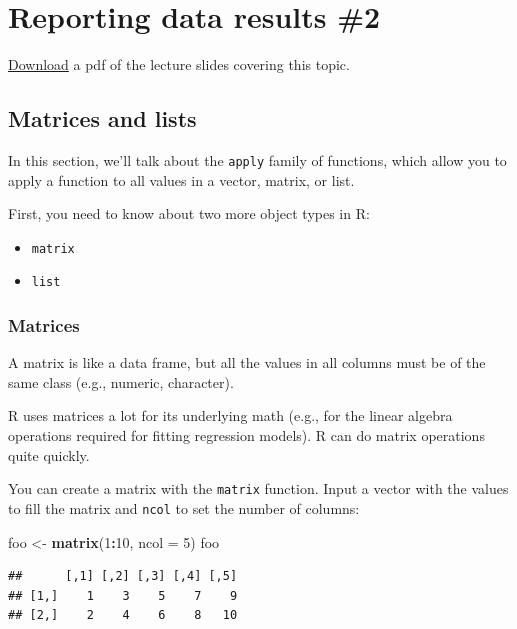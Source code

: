 \documentclass[]{book}
\makeatletter
\newenvironment{Shaded}{\begin{snugshade}}{\end{snugshade}}
\newcommand{\KeywordTok}[1]{\textcolor[rgb]{0.13,0.29,0.53}{\textbf{#1}}}
\newcommand{\DataTypeTok}[1]{\textcolor[rgb]{0.13,0.29,0.53}{#1}}
\newcommand{\DecValTok}[1]{\textcolor[rgb]{0.00,0.00,0.81}{#1}}
\newcommand{\StringTok}[1]{\textcolor[rgb]{0.31,0.60,0.02}{#1}}
\newcommand{\OperatorTok}[1]{\textcolor[rgb]{0.81,0.36,0.00}{\textbf{#1}}}
\newcommand{\NormalTok}[1]{#1}
\providecommand{\tightlist}{%
  \setlength{\itemsep}{0pt}\setlength{\parskip}{0pt}}
\newenvironment{kframe}{%
\medskip{}
\setlength{\fboxsep}{.8em}
 \def\at@end@of@kframe{}%
 \ifinner\ifhmode%
  \def\at@end@of@kframe{\end{minipage}}%
  \begin{minipage}{\columnwidth}%
 \fi\fi%
 \def\FrameCommand##1{\hskip\@totalleftmargin \hskip-\fboxsep
 \colorbox{shadecolor}{##1}\hskip-\fboxsep
     \hskip-\linewidth \hskip-\@totalleftmargin \hskip\columnwidth}%
 \MakeFramed {\advance\hsize-\width
   \@totalleftmargin\z@ \linewidth\hsize
   \@setminipage}}%
 {\par\unskip\endMakeFramed%
 \at@end@of@kframe}
\renewenvironment{Shaded}{\begin{kframe}}{\end{kframe}}
\theoremstyle{definition}
\theoremstyle{definition}
\theoremstyle{definition}
\theoremstyle{remark}
\makeatother
\begin{document}
\chapter{Reporting data results \#2}\label{reporting-data-results-2}

\href{https://github.com/geanders/RProgrammingForResearch/raw/master/slides/CourseNotes_Week8.pdf}{Download}
a pdf of the lecture slides covering this topic.

\section{Matrices and lists}\label{matrices-and-lists}

In this section, we'll talk about the \texttt{apply} family of
functions, which allow you to apply a function to all values in a
vector, matrix, or list. \bigskip

First, you need to know about two more object types in R:

\begin{itemize}
\tightlist
\item
  \texttt{matrix}
\item
  \texttt{list}
\end{itemize}

\subsection{Matrices}\label{matrices}

A matrix is like a data frame, but all the values in all columns must be
of the same class (e.g., numeric, character).

R uses matrices a lot for its underlying math (e.g., for the linear
algebra operations required for fitting regression models). R can do
matrix operations quite quickly.

You can create a matrix with the \texttt{matrix} function. Input a
vector with the values to fill the matrix and \texttt{ncol} to set the
number of columns:

\begin{Shaded}
\begin{Highlighting}[]
\NormalTok{foo <-}\StringTok{ }\KeywordTok{matrix}\NormalTok{(}\DecValTok{1}\OperatorTok{:}\DecValTok{10}\NormalTok{, }\DataTypeTok{ncol =} \DecValTok{5}\NormalTok{)}
\NormalTok{foo}
\end{Highlighting}
\end{Shaded}

\begin{verbatim}
##      [,1] [,2] [,3] [,4] [,5]
## [1,]    1    3    5    7    9
## [2,]    2    4    6    8   10
\end{verbatim}
\end{document}
